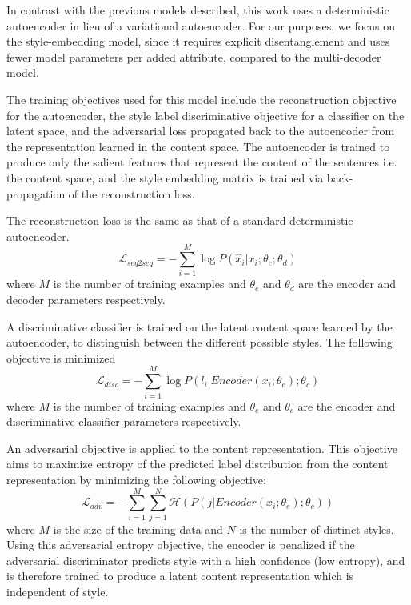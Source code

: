 In contrast with the previous models described, this work uses a deterministic autoencoder in lieu of a variational autoencoder. For our purposes, we focus on the style-embedding model, since it requires explicit disentanglement and uses fewer model parameters per added attribute, compared to the multi-decoder model.

The training objectives used for this model include the reconstruction objective for the autoencoder, the style label discriminative objective for a classifier on the latent space, and the adversarial loss propagated back to the autoencoder from the representation learned in the content space. The autoencoder is trained to produce only the salient features that represent the content of the sentences i.e. the content space, and the style embedding matrix is trained via back-propagation of the reconstruction loss.

The reconstruction loss is the same as that of a standard deterministic autoencoder.
\begin{equation}
	\mathcal{L}_{seq2seq} = -\sum_{i=1}^M \log P(\hat{x}_i|x_i;\theta_e;\theta_d)
\end{equation}
where $M$ is the number of training examples and $\theta_e$ and $\theta_d$ are the encoder and decoder parameters respectively.

A discriminative classifier is trained on the latent content space learned by the autoencoder, to distinguish between the different possible styles. The following objective is minimized
\begin{equation}
	\mathcal{L}_{disc} = -\sum_{i=1}^M \log P(l_i|Encoder(x_i;\theta_e);\theta_c)
\end{equation}
where $M$ is the number of training examples and $\theta_e$ and $\theta_c$ are the encoder and discriminative classifier parameters respectively.

An adversarial objective is applied to the content representation. This objective aims to maximize entropy of the predicted label distribution from the content representation by minimizing the following objective:
\begin{equation}
	\mathcal{L}_{adv} = -\sum_{i=1}^M\sum_{j=1}^N \mathcal{H}(P(j|Encoder(x_i; \theta_e); \theta_c))
\end{equation}
where $M$ is the size of the training data and $N$ is the number of distinct styles. Using this adversarial entropy objective, the encoder is penalized if the adversarial discriminator predicts style with a high confidence (low entropy), and is therefore trained to produce a latent content representation which is independent of style.

